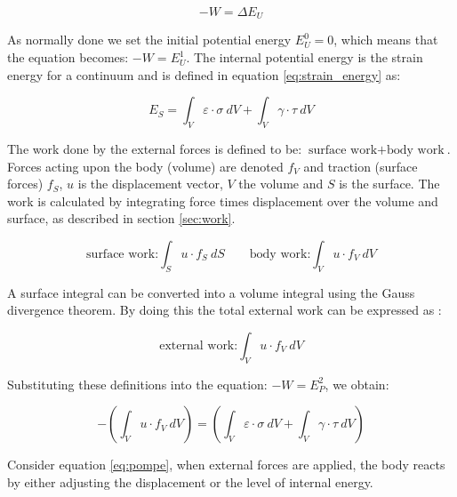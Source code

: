\begin{equation*}
- W = \Delta E_U
\end{equation*}

As normally done we set the initial potential energy $E_U^0 = 0$,
which means that the equation becomes: $- W = E_U^1$. The internal
potential energy is the strain energy for a continuum and is defined
in equation \eqref{eq:strain_energy} as:

\begin{equation*}
  E_S = \int_{V} \varepsilon \cdot \sigma \ dV +
  \int_{V} \gamma \cdot \tau \ dV
\end{equation*}

The work done by the external forces is defined to be:
$\mbox{surface work} + \mbox{body work}$.
Forces acting upon the body (volume) are denoted $f_V$ and traction
(surface forces) $f_S$, $u$ is the displacement vector, $V$ the volume
and $S$ is the surface. The work is calculated by integrating force times
displacement over the volume and surface, as described in section
\vref{sec:work}.

\begin{equation}
  \mbox{surface work:} \int_{S} u \cdot f_S \ dS
  \qquad
  \mbox{body work:} \int_{V} u \cdot f_V \ dV 
\end{equation}

A surface integral can be converted into a volume integral
using the Gauss divergence theorem. By doing this the total external
work can be expressed as
:

\begin{equation}
  \label{eq:external-work}
  \mbox{external work:}
  \int_{V} u \cdot f_V \ dV
\end{equation}

Substituting these definitions into the equation: $ -W= E_P^2$, we obtain:

\begin{equation}
  \label{eq:pompe}
  - ( \int_{V} u \cdot f_V \ dV ) =
  ( \int_{V} \varepsilon \cdot \sigma \ dV +
  \int_{V} \gamma \cdot \tau \ dV )
\end{equation}

Consider equation \eqref{eq:pompe}, when external forces are applied,
the body reacts by either adjusting the displacement or the level of
internal energy.

